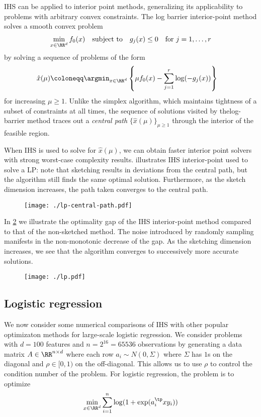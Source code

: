 \documentclass[12pt,letterpaper,boxed]{article}
\begin{document}
IHS can be applied to interior point methods, generalizing its applicability
to problems with arbitrary convex constraints. The log barrier interior-point method
solves a smooth convex problem
\begin{align}
  \min_{x \in \RR^d} f_0(x) \quad\text{subject to}\quad g_j(x) \leq 0 \quad\text{for}~j=1,\ldots,r
\end{align}
by solving a sequence of problems of the form
\begin{align}
  \hat{x}(\mu) &\coloneqq \argmin_{x \in \RR^d} \left\{
    \mu f_0(x) - \sum^{r}_{j=1} \log(-g_j(x))
  \right\}
\end{align}
for increasing $\mu \geq 1$. Unlike the simplex algorithm, which maintains tightness of a subset of constraints at all
times, the sequence of solutions visited by thelog-barrier method traces out a
\emph{central path} $\{\hat{x}(\mu)\}_{\mu \geq 1}$ through the interior of the feasible region.

When IHS is used to solve for $\hat{x}(\mu)$, we can obtain faster interior point
solvers with strong worst-case complexity results. 
illustrates IHS interior-point used to solve a LP: note that
sketching results in deviations from the central path, but the algorithm still finds the same
optimal solution. Furthermore, as the sketch dimension increases, the path taken
converges to the central path.

\begin{figure}[htpb]
  \centering
  \texttt{[image: ./lp-central-path.pdf]}
  \caption{}
  \label{fig:central-path}
\end{figure}

In \cref{fig:lp} we illustrate the optimality gap of the IHS interior-point method
compared to that of the non-sketched method. The noise introduced by randomly
sampling manifests in the non-monotonic decrease of the gap. As the sketching
dimension increases, we see that the algorithm converges to successively more
accurate solutions.

\begin{figure}[htpb]
  \centering
  \texttt{[image: ./lp.pdf]}
  \caption{}
  \label{fig:lp}
\end{figure}

\subsection{Logistic regression}

We now consider some numerical comparisons of IHS with other popular
optimizaton methods for large-scale logistic regression.
We consider problems with $d = 100$ features and $n = 2^{16} = 65536$ observations
by generating a data matrix $A \in \RR^{n \times d}$ where each row
$a_i \sim N(0, \Sigma)$ where $\Sigma$ has $1$s on the diagonal and $\rho \in [0,1)$
on the off-diagonal. This allows us to use $\rho$ to control the condition number of the problem.
For logistic regression, the problem is to optimize
\begin{align}
  \min_{x \in \RR^d} \sum_{i=1}^n \log(1 + \exp(a_i^\tp x y_i))
\end{align}
\end{document}
